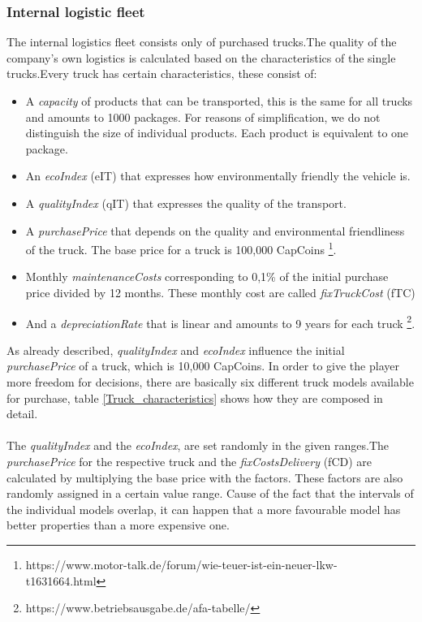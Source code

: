 \subsubsection{Internal logistic fleet}
The internal logistics fleet consists only of purchased trucks.The quality of the company's own logistics is calculated based on the characteristics of the single trucks.Every truck has certain characteristics, these consist of:
\begin{itemize}
    \item A \textit{capacity} of products that can be transported, this is the same for all trucks and amounts to 1000 packages. For reasons of simplification, we do not distinguish the size of individual products.  Each product is equivalent to one package. 
    \item An \textit{ecoIndex} (\gls{eIT}) that expresses how environmentally friendly the vehicle is.
    \item A \textit{qualityIndex} (\gls{qIT}) that expresses the quality of the transport.
    \item A \textit{purchasePrice} that depends on the quality and environmental friendliness of the truck. The base price for a truck is 100,000 CapCoins 
    \footnote{https://www.motor-talk.de/forum/wie-teuer-ist-ein-neuer-lkw-t1631664.html}.
    \item Monthly \textit{maintenanceCosts} corresponding to 0,1\% of the initial purchase price divided by 12 months. These monthly cost are called \textit{fixTruckCost} (\gls{fTC})
    \item And a \textit{depreciationRate} that is linear and amounts to 9 years for each truck \footnote{https://www.betriebsausgabe.de/afa-tabelle/}.
\end{itemize}

As already described, \textit{qualityIndex} and \textit{ecoIndex} influence the initial \textit{purchasePrice} of a truck, which is 10,000 CapCoins. In order to give the player more freedom for decisions, there are basically six different truck models available for purchase, table \ref{Truck_characteristics} shows how they are composed in detail.\\
\\
The \textit{qualityIndex} and the \textit{ecoIndex}, are set randomly in the given ranges.The \textit{purchasePrice} for the respective truck and the \textit{fixCostsDelivery} (\gls{fCD}) are calculated by multiplying the base price with the factors. These factors are also randomly assigned in a certain value range. Cause of the fact that the intervals of the individual models overlap, it can happen that a more favourable model has better properties than a more expensive one.

